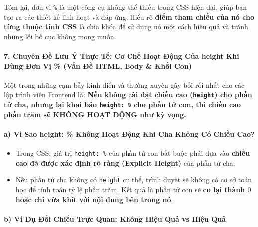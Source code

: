 \documentclass[11pt,oneside]{book}
\newcommand{\codeinline}[1]{\textcolor{accentOrange}{\texttt{#1}}}
\newcommand{\term}[1]{\textbf{\textcolor{primaryBlue}{#1}}}
\begin{document}
\begin{noteBox}
Tóm lại, đơn vị \codeinline{\%} là một công cụ không thể thiếu trong CSS hiện đại, giúp bạn tạo ra các thiết kế linh hoạt và đáp ứng. Hiểu rõ \textbf{điểm tham chiếu của nó cho từng thuộc tính CSS} là chìa khóa để sử dụng nó một cách hiệu quả và tránh những lỗi bố cục không mong muốn.
\end{noteBox}

\paragraph{7. Chuyên Đề Lưu Ý Thực Tế: Cơ Chế Hoạt Động Của height Khi Dùng Đơn Vị \% (Vấn Đề HTML, Body \& Khối Con)}
\label{sec:css_percentage_height_masterclass}

Một trong những cạm bẫy kinh điển và thường xuyên gây bối rối nhất cho các lập trình viên Frontend là: \textbf{Nếu không cài đặt chiều cao (\codeinline{height}) cho phần tử cha, nhưng lại khai báo \codeinline{height: \%} cho phần tử con, thì chiều cao phần trăm sẽ KHÔNG HOẠT ĐỘNG như kỳ vọng.}

\paragraph{a) Vì Sao height: \% Không Hoạt Động Khi Cha Không Có Chiều Cao?}

\begin{warnBox}
\begin{itemize}[leftmargin=1.5em, itemsep=2pt, parsep=0pt]
    \item Trong CSS, giá trị \codeinline{height: \%} của phần tử con bắt buộc phải dựa vào \textbf{chiều cao đã được xác định rõ ràng (\term{Explicit Height})} của phần tử cha.
    \item Nếu phần tử cha không có \codeinline{height} cụ thể, trình duyệt sẽ không có cơ sở toán học để tính toán tỷ lệ phần trăm. Kết quả là phần tử con sẽ \textbf{co lại thành $0$ hoặc chỉ vừa khít với nội dung bên trong nó}.
\end{itemize}
\end{warnBox}

\paragraph{b) Ví Dụ Đối Chiếu Trực Quan: Không Hiệu Quả vs Hiệu Quả}
\end{document}
